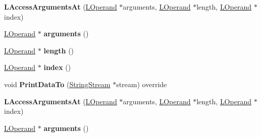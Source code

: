 \begin{DoxyCompactItemize}
\item 
{\bfseries L\+Access\+Arguments\+At} (\hyperlink{classv8_1_1internal_1_1_l_operand}{L\+Operand} $\ast$arguments, \hyperlink{classv8_1_1internal_1_1_l_operand}{L\+Operand} $\ast$length, \hyperlink{classv8_1_1internal_1_1_l_operand}{L\+Operand} $\ast$index)\hypertarget{classv8_1_1internal_1_1_l_access_arguments_at_a8b3a736e564c8f5337bf40bebffae277}{}\label{classv8_1_1internal_1_1_l_access_arguments_at_a8b3a736e564c8f5337bf40bebffae277}

\item 
\hyperlink{classv8_1_1internal_1_1_l_operand}{L\+Operand} $\ast$ {\bfseries arguments} ()\hypertarget{classv8_1_1internal_1_1_l_access_arguments_at_a54eb42639fc35df69b3a3f57d7042ffd}{}\label{classv8_1_1internal_1_1_l_access_arguments_at_a54eb42639fc35df69b3a3f57d7042ffd}

\item 
\hyperlink{classv8_1_1internal_1_1_l_operand}{L\+Operand} $\ast$ {\bfseries length} ()\hypertarget{classv8_1_1internal_1_1_l_access_arguments_at_aca767dd582bd23265453d015e4cb3174}{}\label{classv8_1_1internal_1_1_l_access_arguments_at_aca767dd582bd23265453d015e4cb3174}

\item 
\hyperlink{classv8_1_1internal_1_1_l_operand}{L\+Operand} $\ast$ {\bfseries index} ()\hypertarget{classv8_1_1internal_1_1_l_access_arguments_at_a6d772ab178a18a50a3fa64dee0cab4c7}{}\label{classv8_1_1internal_1_1_l_access_arguments_at_a6d772ab178a18a50a3fa64dee0cab4c7}

\item 
void {\bfseries Print\+Data\+To} (\hyperlink{classv8_1_1internal_1_1_string_stream}{String\+Stream} $\ast$stream) override\hypertarget{classv8_1_1internal_1_1_l_access_arguments_at_a3027cb02e655a31d8f9264d10b49c7be}{}\label{classv8_1_1internal_1_1_l_access_arguments_at_a3027cb02e655a31d8f9264d10b49c7be}

\item 
{\bfseries L\+Access\+Arguments\+At} (\hyperlink{classv8_1_1internal_1_1_l_operand}{L\+Operand} $\ast$arguments, \hyperlink{classv8_1_1internal_1_1_l_operand}{L\+Operand} $\ast$length, \hyperlink{classv8_1_1internal_1_1_l_operand}{L\+Operand} $\ast$index)\hypertarget{classv8_1_1internal_1_1_l_access_arguments_at_a8b3a736e564c8f5337bf40bebffae277}{}\label{classv8_1_1internal_1_1_l_access_arguments_at_a8b3a736e564c8f5337bf40bebffae277}

\item 
\hyperlink{classv8_1_1internal_1_1_l_operand}{L\+Operand} $\ast$ {\bfseries arguments} ()\hypertarget{classv8_1_1internal_1_1_l_access_arguments_at_a54eb42639fc35df69b3a3f57d7042ffd}{}\label{classv8_1_1internal_1_1_l_access_arguments_at_a54eb42639fc35df69b3a3f57d7042ffd}


\end{DoxyCompactItemize}
